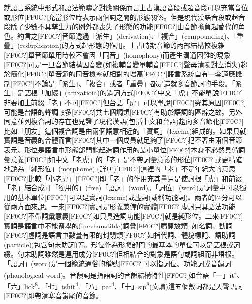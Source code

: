 \textrm{就語言系統中形式和語法範疇之對應關係而言上古漢語音段或超音段可以充當音位或形位[FF0C?]充當形位時表示兩個詞之間的形態關係。但是現代漢語音段或超音段除了少數不具孳生力的例外都喪失了形態的功能[FF0C?]由音節擔負起替代的角色。約言之[FF0C?]音節透過「派生」(derivation)}、\textrm{「複合」(compounding)}、\textrm{「重疊」(reduplication)的方式起形態的作用。上古時期音節的內部結構較複雜[FF0C?]單音節單用時較不會因「同音」(homophony)而產生溝通困難的現象[FF0C?]可是一旦音節結構因音變(如複輔音變單輔音[FF0C?]聲母清濁對立消失)趨於簡化[FF0C?]單音節的同音機率就相對的增高[FF0C?]語言系統自有一套適應機制[FF0C?]不論是「派生」、「複合」或者「重疊」都是造就多音節詞的手段。「派生」是語根「加綴」(affixatioin)的造詞方式[FF0C?]中文「虎」不能單說[FF0C?]非要加上前綴「老」不可[FF0C?]但台語「虎」可以單說[FF0C?]究其原因[FF0C?]可能是台語的聲調較多[FF0C?]共七個調類[FF0C?]有助於語詞的區辨之故。另外同意並列複合詞的存在也見證了現代漢語(包括中文和台語)趨向多音節化[FF0C?]比如「朋友」這個複合詞是由兩個語意相近的「實詞」(lexeme)組成的。如果只就實詞是音義的合體而言[FF0C?]其中一個成員就足夠了}[FF0C?]\textrm{犯不著由兩個音節表示。形位是語言中形態部門能起造詞作用的最小單位[FF0C?]本身不必然具備詞彙意義[FF0C?]如中文「老虎」的「老」是不帶詞彙意義的形位[FF0C?]或更精確地說為「純形位」(morphome) (詳O’\citealt{Neill2013})}[FF0C?]\textrm{這裡的「老」不是年紀大的意思[FF0C?]比較「小老虎」[FF0C?]即「老」的作用充其量只是使詞根「虎」和前綴「老」結合成可「獨用的」(free)「語詞」(word)}。\textrm{「詞位」(word)是詞彙中可以獨用的基本單位}[FF0C?]\textrm{可以是實詞(lexeme)或虛詞(或稱功能詞)}。\textrm{兩者的區分可以從兩方面來說}。\textrm{一來}[FF0C?]\textrm{實詞是形義兼備的實體}[FF0C?]\textrm{虛詞只具語法功能}[FF0C?]\textrm{不帶詞彙意義}[FF0C?]\textrm{如只具造詞功能}[FF0C?]\textrm{就是純形位}。\textrm{二來}[FF0C?]\textrm{實詞是語言中不能窮舉的(inexhaustible)詞彙}[FF0C?]\textrm{屬開放類, 如名詞、動詞[FF0C?]虛詞是語言中數量有限的封閉類}[FF0C?]\textrm{如指代詞}、\textrm{體貌標記}、\textrm{語助詞(particle)(包含句末助詞)等}。\textrm{形位作為形態部門的最基本的單位可以是語根或詞綴}。\textrm{句末助詞雖然是連用成分}[FF0C?]\textrm{但相結合的對象是語句或詞組而非語根}。\textrm{「語詞」(word)是一個籠統通俗的稱號[FF0C?]可以指詞位、功能詞或音韻詞 (phonological word)}。\textrm{音韻詞是指語詞的音韻結構特性[FF0C?]如台語「一」it}\textrm{\textsuperscript{4}}\textrm{、「六」liok}\textrm{\textsuperscript{8}}\textrm{、「七」tshit}\textrm{\textsuperscript{4}}\textrm{、「八」pat}\textrm{\textsuperscript{4}}\textrm{、「十」sip}\textrm{\textsuperscript{8}}\textrm{(文讀)這五個數詞都是入聲語詞[FF0C?]即帶清塞音韻尾的音節。}


